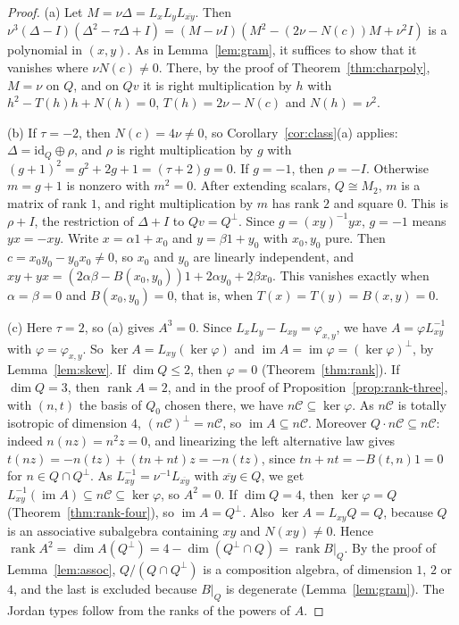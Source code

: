 \documentclass[11pt]{amsart}
\theoremstyle{definition}
\theoremstyle{remark}
\newcommand{\C}{\mathcal{C}}
\newcommand{\conj}[1]{\overline{#1}}
\DeclareMathOperator{\rank}{rank}
\begin{document}
\begin{proof}
(a) Let $M=\nu\Delta=L_xL_yL_{\conj{xy}}$. Then
$\nu^3(\Delta-I)(\Delta^2-\tau\Delta+I)=(M-\nu I)(M^2-(2\nu-N(c))M+\nu^2I)$
is a polynomial in $(x,y)$. As in Lemma~\ref{lem:gram}, it suffices to show
that it vanishes where $\nu N(c)\neq0$. There, by the proof of
Theorem~\ref{thm:charpoly}, $M=\nu$ on $Q$, and on $Qv$ it is right
multiplication by $h$ with $h^2-T(h)h+N(h)=0$, $T(h)=2\nu-N(c)$ and
$N(h)=\nu^2$.

(b) If $\tau=-2$, then $N(c)=4\nu\neq0$, so Corollary~\ref{cor:class}(a)
applies: $\Delta=\mathrm{id}_Q\oplus\rho$, and $\rho$ is right multiplication
by $g$ with $(g+1)^2=g^2+2g+1=(\tau+2)g=0$. If $g=-1$, then $\rho=-I$.
Otherwise $m=g+1$ is nonzero with $m^2=0$. After extending scalars,
$Q\cong M_2$, $m$ is a matrix of rank $1$, and right multiplication by $m$ has
rank $2$ and square $0$. This is $\rho+I$, the restriction of $\Delta+I$ to
$Qv=Q^\perp$. Since $g=(xy)^{-1}yx$, $g=-1$ means $yx=-xy$. Write
$x=\alpha1+x_0$ and $y=\beta1+y_0$ with $x_0,y_0$ pure. Then $c=x_0y_0-y_0x_0\neq0$,
so $x_0$ and $y_0$ are linearly independent, and
$xy+yx=(2\alpha\beta-B(x_0,y_0))1+2\alpha y_0+2\beta x_0$. This vanishes
exactly when $\alpha=\beta=0$ and $B(x_0,y_0)=0$, that is, when
$T(x)=T(y)=B(x,y)=0$.

(c) Here $\tau=2$, so (a) gives $A^3=0$. Since
$L_xL_y-L_{xy}=\varphi_{x,y}$, we have $A=\varphi L_{xy}^{-1}$ with
$\varphi=\varphi_{x,y}$. So $\ker A=L_{xy}(\ker\varphi)$ and
$\operatorname{im}A=\operatorname{im}\varphi=(\ker\varphi)^\perp$, by
Lemma~\ref{lem:skew}. If $\dim Q\le2$, then $\varphi=0$
(Theorem~\ref{thm:rank}). If $\dim Q=3$, then $\rank A=2$, and in the proof of
Proposition~\ref{prop:rank-three}, with $(n,t)$ the basis of $Q_0$ chosen
there, we have $n\C\subseteq\ker\varphi$. As $n\C$ is
totally isotropic of dimension $4$, $(n\C)^\perp=n\C$, so
$\operatorname{im}A\subseteq n\C$. Moreover $Q\cdot n\C\subseteq n\C$: indeed
$n(nz)=n^2z=0$, and linearizing the left alternative law gives
$t(nz)=-n(tz)+(tn+nt)z=-n(tz)$, since $tn+nt=-B(t,n)1=0$ for
$n\in Q\cap Q^\perp$. As $L_{xy}^{-1}=\nu^{-1}L_{\conj{xy}}$ with
$\conj{xy}\in Q$, we get $L_{xy}^{-1}(\operatorname{im}A)\subseteq
n\C\subseteq\ker\varphi$, so $A^2=0$. If $\dim Q=4$, then $\ker\varphi=Q$
(Theorem~\ref{thm:rank-four}), so $\operatorname{im}A=Q^\perp$. Also
$\ker A=L_{xy}Q=Q$, because $Q$ is an associative subalgebra containing $xy$
and $N(xy)\neq0$. Hence
$\rank A^2=\dim A(Q^\perp)=4-\dim(Q^\perp\cap Q)=\rank B|_Q$. By the proof of
Lemma~\ref{lem:assoc}, $Q/(Q\cap Q^\perp)$ is a composition algebra, of
dimension $1$, $2$ or $4$, and the last is excluded because $B|_Q$ is
degenerate (Lemma~\ref{lem:gram}). The Jordan types follow from the ranks of
the powers of $A$.
\end{proof}
\end{document}
